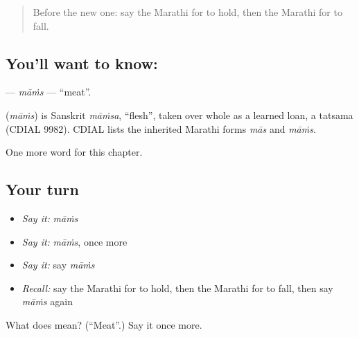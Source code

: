 \label{lesson:MR-C84-mams}



\begin{quote}
Before the new one: say the Marathi for to hold, then the Marathi for to fall.
\end{quote}

\subsection*{You'll want to know: }
\textbf{} — \emph{māṁs} — \textquotedblleft{}meat\textquotedblright{}.

\begin{cousinweb}
\textbf{} (\emph{māṁs}) is Sanskrit \emph{māṁsa}, \textquotedblleft{}flesh\textquotedblright{}, taken over whole as a learned loan, a tatsama (CDIAL 9982). CDIAL lists the inherited Marathi forms \emph{mās} and \emph{māṁs}.
\end{cousinweb}

\begin{grammarlens}[title={What you've built}]
One more word for this chapter.
\end{grammarlens}

\subsection*{Your turn}
\begin{itemize}
\raggedright
  \item \emph{Say it:} \emph{māṁs}
  \item \emph{Say it:} \emph{māṁs}, once more
  \item \emph{Say it:} say \emph{māṁs}
  \item \emph{Recall:} say the Marathi for to hold, then the Marathi for to fall, then say \emph{māṁs} again
\end{itemize}

\begin{tcolorbox}[breakable,colback=teal!4,colframe=teal!35!black,title={Before you move on}]
What does  mean? (\textquotedblleft{}Meat\textquotedblright{}.) Say it once more.
\end{tcolorbox}
